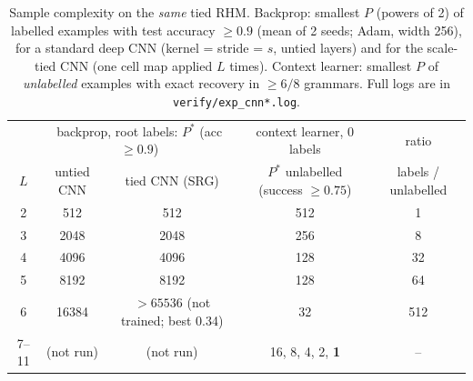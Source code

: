 \documentclass[11pt]{article}
\theoremstyle{definition}
\begin{document}
\begin{table}[h]\centering
\caption{Sample complexity on the \emph{same} tied RHM. Backprop: smallest $P$ (powers of 2) of
labelled examples with test accuracy $\ge0.9$ (mean of 2 seeds; Adam, width 256), for a standard
deep CNN (kernel = stride = $s$, untied layers) and for the scale-tied CNN (one cell map applied
$L$ times). Context learner: smallest $P$ of \emph{unlabelled} examples with exact recovery in
$\ge6/8$ grammars. Full logs are in \texttt{verify/exp\_cnn*.log}.}\label{tab:cnn}
\small\begin{tabular}{ccccc}\toprule
& \multicolumn{2}{c}{backprop, root labels: $P^*$ (acc $\ge0.9$)} & context learner, 0 labels & ratio\\
$L$ & untied CNN & tied CNN (SRG) & $P^*$ unlabelled (success $\ge0.75$) & labels / unlabelled\\\midrule
2 & 512 & 512 & 512 & 1\\
3 & 2048 & 2048 & 256 & 8\\
4 & 4096 & 4096 & 128 & 32\\
5 & 8192 & 8192 & 128 & 64\\
6 & 16384 & $>65536$ (not trained; best 0.34) & 32 & 512\\
7--11 & (not run) & (not run) & 16, 8, 4, 2, \textbf{1} & --\\
\bottomrule\end{tabular}
\end{table}
\end{document}
